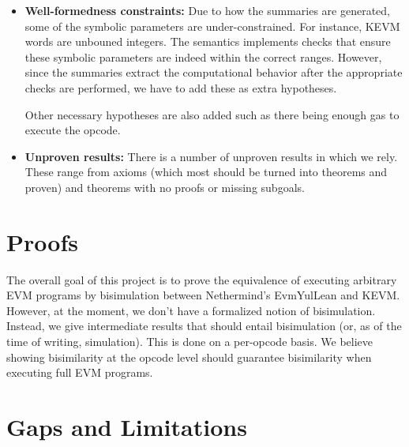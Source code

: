\begin{itemize}
\item \textbf{Well-formedness constraints:} Due to how the summaries are generated, some of the symbolic parameters are under-constrained. For instance, KEVM words are unbouned integers.
  The semantics implements checks that ensure these symbolic parameters are indeed within the correct ranges. However, since the summaries extract the computational behavior after the appropriate checks are performed, we have to add these as extra hypotheses.

  Other necessary hypotheses are also added such as there being enough gas to execute the opcode.
\item \textbf{Unproven results:} There is a number of unproven results in which we rely. These range from axioms (which most should be turned into theorems and proven) and theorems with no proofs or missing subgoals.
\end{itemize}

\section{Proofs}

The overall goal of this project is to prove the equivalence of executing arbitrary EVM programs by bisimulation between Nethermind's EvmYulLean and KEVM.
However, at the moment, we don't have a formalized notion of bisimulation.
Instead, we give intermediate results that should entail bisimulation (or, as of the time of writing, simulation).
This is done on a per-opcode basis. We believe showing bisimilarity at the opcode level should guarantee bisimilarity when executing full EVM programs.

\section{Gaps and Limitations}

